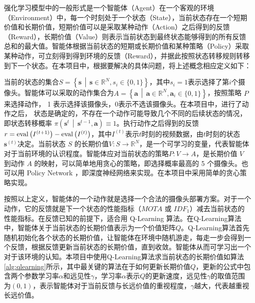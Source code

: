 强化学习模型中的一般形式是一个智能体（Agent）在一个客观的环境（Environment）中，每一个时刻处于一个状态（State），当前状态存在一个短期价值和长期价值，短期价值可以是采取某种动作（Action）之后得到的反馈（Reward），长期价值（Value）则表示当前状态到最终状态能够得到的所有反馈总和的最大值。智能体根据当前状态的短期或长期价值和某种策略（Policy）采取某种动作，可立刻得到得到环境的反馈（Reward），并据此按照状态转移规则转移到下一个状态。在本项目中，根据要解决的具体问题，将上述概念相应定义如下：

当前的状态的集合$S=\left\{\boldsymbol{s}\,\middle\vert\,\boldsymbol{s}\in\mathbb{R}^{N}, s_i\in\{0, 1\}\right\}$，其中$s_i=1$表示选择了第$i$个摄像头。智能体可以采取的动作集合为$A=\left\{\boldsymbol{a}\,\middle\vert\,\boldsymbol{a}\in\mathbb{R}^N,\boldsymbol{a}_i \in \{0,1\}\right\}$，按照策略 $P$ 来选择动作， 1 表示选择该摄像头，0表示不选该摄像头。在本项目中，进行了动作之后， 状态是确定的，不存在一个动作可能导致几个不同的后续状态的情况，即状态转移概率 $\pi\left(\boldsymbol{s}^t\,\middle\vert\,\boldsymbol{s}^{t-1}, \boldsymbol{a}\right)\equiv1$。执行动作之后得到的反馈$r=\mathop{\rm{eval}}\left(I^{(t+1)}\right)-\mathop{\rm{eval}}\left(I^{(t)}\right)$，其中$I^{(t)}$表示$t$时刻的视频数据，由$t$时刻的状态$\boldsymbol{s}^{(t)}$决定。当前状态 $S$ 的长期价值$V:S\to \mathbb{R}^N$，是一个可学习的变量，代表智能体对于当前环境的认识程度。智能体应对当前状态的策略$P:V \to A$，是长期价值 $V$ 到动作 $A$ 的映射，可以简单地用贪心的策略，即选择概率最高的 5 个摄像头。也可以用 Policy Network ，即深度神经网络来实现。在本项目中采用简单的贪心策略实现。

按照以上定义，智能体的一个动作就是选择一个合法的摄像头部署方案。对于一个动作，它的反馈就是下一个状态的性能指标（$\mathit{MOTA}$ 或 $\mathit{IDF_1}$）减去当前状态的性能指标。在反馈已知的前提下，适合用 Q-Learning\cite{watkins1989learning} 算法。在Q-Learning算法中，智能体关于当前状态的长期价值表示为一个价值矩阵$Q$。Q-Learning算法首先随机初始化各个状态的长期价值，让智能体在环境中随机游走，每走一步会得到一个反馈，根据反馈更新当前状态的长期价值，直到收敛。智能体从而可学习出一个对于该环境的认知。本项目中使用Q-Learning算法求当前状态的长期价值如算法\ref{alg:qlearning}所示，其中最关键的算法在于如何更新长期价值$Q$，更新的公式中包含两个参数学习率$\alpha$和远见性$\gamma$，学习率$\alpha$表示$Q$的更新速度，远见性$\gamma$的取值范围为$(0, 1)$，表示智能体对于当前反馈与长远价值的重视程度，$\gamma$越大，代表越重视长远价值。

